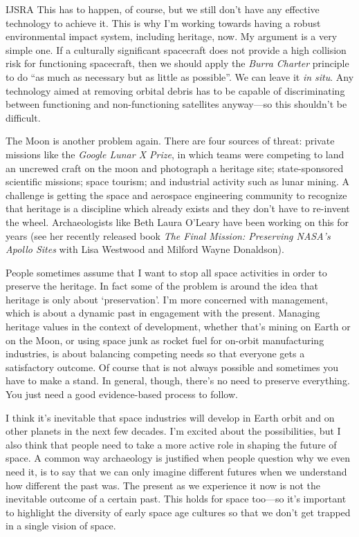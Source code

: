 \begin{labeling}{IJSRA}
	This has to happen, of course, but we still don’t have any effective technology to achieve it. This is why I’m working towards having a robust environmental impact system, including heritage, now. My argument is a very simple one. If a culturally significant spacecraft does not provide a high collision risk for functioning spacecraft, then we should apply the \emph{Burra Charter} principle to do “as much as necessary but as little as possible”. We can leave it \emph{in situ}. Any technology aimed at removing orbital debris has to be capable of discriminating between functioning and non-functioning satellites anyway—so this shouldn’t be difficult.

	The Moon is another problem again. There are four sources of threat: private missions like the \emph{Google Lunar X Prize}, in which teams were competing to land an uncrewed craft on the moon and photograph a heritage site; state-sponsored scientific missions; space tourism; and industrial activity such as lunar mining. A challenge is getting the space and aerospace engineering community to recognize that heritage is a discipline which already exists and they don’t have to re-invent the wheel. Archaeologists like Beth Laura O’Leary have been working on this for years (see her recently released book \emph{The Final Mission: Preserving NASA’s Apollo Sites} with Lisa Westwood and Milford Wayne Donaldson).

	People sometimes assume that I want to stop all space activities in order to preserve the heritage. In fact some of the problem is around the idea that heritage is only about ‘preservation’. I’m more concerned with management, which is about a dynamic past in engagement with the present. Managing heritage values in the context of development, whether that’s mining on Earth or on the Moon, or using space junk as rocket fuel for on-orbit manufacturing industries, is about balancing competing needs so that everyone gets a satisfactory outcome. Of course that is not always possible and sometimes you have to make a stand. In general, though, there’s no need to preserve everything. You just need a good evidence-based process to follow.

	I think it’s inevitable that space industries will develop in Earth orbit and on other planets in the next few decades. I’m excited about the possibilities, but I also think that people need to take a more active role in shaping the future of space. A common way archaeology is justified when people question why we even need it, is to say that we can only imagine different futures when we understand how different the past was. The present as we experience it now is not the inevitable outcome of a certain past. This holds for space too—so it’s important to highlight the diversity of early space age cultures so that we don’t get trapped in a single vision of space.


\end{labeling}
